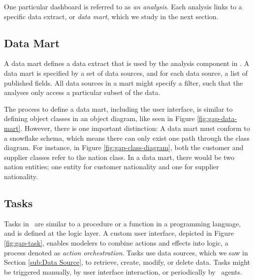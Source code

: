 One particular dashboard is referred to as \textit{an analysis}. Each analysis links to a specific data extract, or \textit{data mart}, which we study in the next section.

\subsection{Data Mart}
\label{sub:Data Mart}

A data mart defines a data extract that is used by the analysis component in \gap. A data mart is specified by a set of data sources, and for each data source, a list of published fields. All data sources in a mart might specify a filter, such that the analyses only access a particular subset of the data. 

The process to define a data mart, including the user interface, is similar to defining object classes in an object diagram, like seen in Figure \ref{fig:gap-data-mart}. However, there is one important distinction: A data mart must conform to a snowflake schema, which means there can only exist one path through the class diagram. For instance, in Figure \ref{fig:gap-class-diagram}, both the customer and supplier classes refer to the nation class. In a data mart, there would be two nation entities; one entity for customer nationality and one for supplier nationality.

\subsection{Tasks}
\label{sub:Tasks}


Tasks in \gap~are similar to a procedure or a function in a programming language, and is defined at the logic layer. A custom user interface, depicted in Figure \ref{fig:gap-task}, enables modelers to combine actions and effects into logic, a process denoted as \textit{action orchestration}. Tasks use data sources, which we saw in Section \ref{sub:Data Source}, to retrieve, create, modify, or delete data. Tasks might be triggered manually, by user interface interaction, or periodically by \gap~agents.


